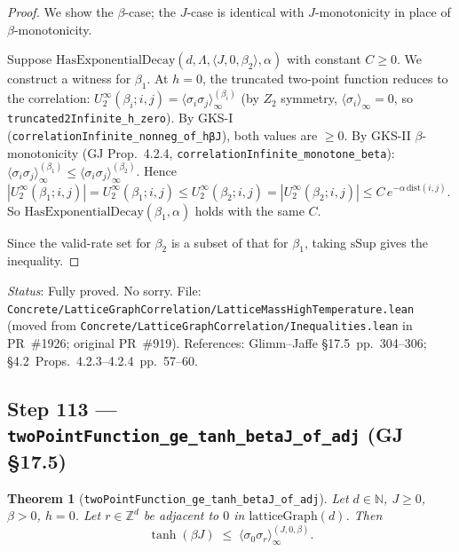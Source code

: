 \documentclass[a4paper,11pt]{article}
\newtheorem{theorem}{Theorem}
\begin{document}
\begin{proof}
We show the $\beta$-case; the $J$-case is identical with $J$-monotonicity in place of $\beta$-monotonicity.

Suppose $\mathrm{HasExponentialDecay}(d,\Lambda,\langle J,0,\beta_2\rangle,\alpha)$
with constant $C \ge 0$.  We construct a witness for $\beta_1$.
At $h = 0$, the truncated two-point function reduces to the correlation:
$U_2^\infty(\beta_i; i,j) = \langle\sigma_i\sigma_j\rangle_\infty^{(\beta_i)}$
(by $Z_2$ symmetry, $\langle\sigma_i\rangle_\infty = 0$, so \texttt{truncated2Infinite\_h\_zero}).
By GKS-I (\texttt{correlationInfinite\_nonneg\_of\_hβJ}), both values are $\ge 0$.
By GKS-II $\beta$-monotonicity (GJ Prop.~4.2.4,
\texttt{correlationInfinite\_monotone\_beta}):
$\langle\sigma_i\sigma_j\rangle_\infty^{(\beta_1)} \le
\langle\sigma_i\sigma_j\rangle_\infty^{(\beta_2)}$.
Hence $|U_2^\infty(\beta_1;i,j)| = U_2^\infty(\beta_1;i,j) \le
U_2^\infty(\beta_2;i,j) = |U_2^\infty(\beta_2;i,j)| \le C\,e^{-\alpha\,\mathrm{dist}(i,j)}$.
So $\mathrm{HasExponentialDecay}(\beta_1,\alpha)$ holds with the same $C$.

Since the valid-rate set for $\beta_2$ is a subset of that for $\beta_1$,
taking $\mathrm{sSup}$ gives the inequality.
\end{proof}

\noindent\textit{Status}: Fully proved. No sorry.
File: \texttt{Concrete/LatticeGraphCorrelation/LatticeMassHighTemperature.lean} (moved from \texttt{Concrete/LatticeGraphCorrelation/Inequalities.lean} in PR~\#1926; original PR~\#919).
References: Glimm--Jaffe \S17.5~pp.~304--306; \S4.2~Props.~4.2.3--4.2.4~pp.~57--60.

\subsection*{Step 113 — \texttt{twoPointFunction\_ge\_tanh\_betaJ\_of\_adj} (GJ \S17.5)}

\begin{theorem}[\texttt{twoPointFunction\_ge\_tanh\_betaJ\_of\_adj}]
Let $d \in \mathbb{N}$, $J \ge 0$, $\beta > 0$, $h = 0$.
Let $r \in \mathbb{Z}^d$ be adjacent to $0$ in $\mathrm{latticeGraph}(d)$.  Then
\[
  \tanh(\beta J) \;\le\; \langle\sigma_0\sigma_r\rangle_\infty^{(J,0,\beta)}.
\]
\end{theorem}
\end{document}
